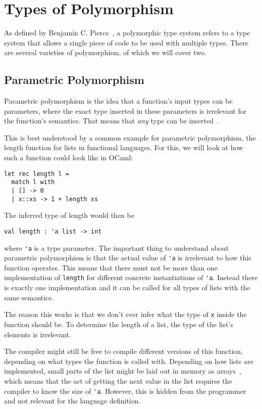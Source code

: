 \section{Types of Polymorphism}

As defined by Benjamin C. Pierce~\cite[Chapter~23.2]{pierce-types}, a polymorphic type system refers to a type system that allows a single piece of code to be used with multiple types. There are several varieties of polymorphism, of which we will cover two.

\subsection{Parametric Polymorphism}

Parametric polymorphism is the idea that a function's input types can be parameters, where the exact type inserted in these parameters is irrelevant for the function's semantics. That means that \emph{any} type can be inserted~\cite[Chapter~23.2]{pierce-types}.

This is best understood by a common example for parametric polymorphism, the length function for lists in functional languages. For this, we will look at how such a function could look like in OCaml:
\begin{verbatim}
let rec length l =
  match l with
  | [] -> 0
  | x::xs -> 1 + length xs
\end{verbatim}
The inferred type of length would then be
\begin{verbatim}
val length : 'a list -> int
\end{verbatim}
where \verb|'a| is a type parameter. The important thing to understand about parametric polymorphism is that the actual value of \verb|'a| is irrelevant to how this function operates. This means that there must not be more than one implementation of \verb|length| for different concrete instantiations of \verb|'a|. Instead there is exactly one implementation and it can be called for all types of lists with the same semantics.

The reason this works is that we don't ever infer what the type of \verb|x| inside the function should be. To determine the length of a list, the type of the list's elements is irrelevant.

The compiler might still be free to compile different versions of this function, depending on what types the function is called with. Depending on how lists are implemented, small parts of the list might be laid out in memory as arrays~\cite{functional-lists}, which means that the act of getting the next value in the list requires the compiler to know the size of \verb|'a|. However, this is hidden from the programmer and not relevant for the language definition.

